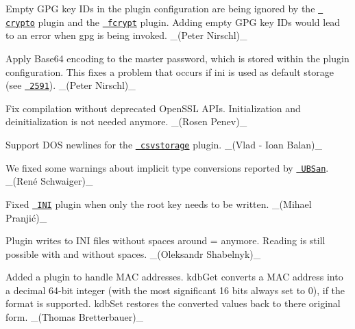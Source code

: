 \begin{DoxyItemize}
\item Empty G\+PG key I\+Ds in the plugin configuration are being ignored by the \href{https://www.libelektra.org/plugins/crypto}{\texttt{ crypto}} plugin and the \href{https://www.libelektra.org/plugins/fcrypt}{\texttt{ fcrypt}} plugin. Adding empty G\+PG key I\+Ds would lead to an error when {\ttfamily gpg} is being invoked. \+\_\+(\+Peter Nirschl)\+\_\+
\item Apply Base64 encoding to the master password, which is stored within the plugin configuration. This fixes a problem that occurs if ini is used as default storage (see \href{https://github.com/ElektraInitiative/libelektra/issues/2591}{\texttt{ 2591}}). \+\_\+(\+Peter Nirschl)\+\_\+
\item Fix compilation without deprecated Open\+S\+SL A\+P\+Is. Initialization and deinitialization is not needed anymore. \+\_\+(\+Rosen Penev)\+\_\+
\end{DoxyItemize}


\begin{DoxyItemize}
\item Support D\+OS newlines for the \href{https://www.libelektra.org/plugins/csvstorage}{\texttt{ csvstorage}} plugin. \+\_\+(Vlad -\/ Ioan Balan)\+\_\+
\end{DoxyItemize}


\begin{DoxyItemize}
\item We fixed some warnings about implicit type conversions reported by \href{https://clang.llvm.org/docs/UndefinedBehaviorSanitizer.html}{\texttt{ U\+B\+San}}. \+\_\+(René Schwaiger)\+\_\+
\end{DoxyItemize}


\begin{DoxyItemize}
\item Fixed \href{https://www.libelektra.org/plugins/ini}{\texttt{ I\+NI}} plugin when only the root key needs to be written. \+\_\+(Mihael Pranjić)\+\_\+
\item Plugin writes to I\+NI files without spaces around \textquotesingle{}=\textquotesingle{} anymore. Reading is still possible with and without spaces. \+\_\+(\+Oleksandr Shabelnyk)\+\_\+
\end{DoxyItemize}


\begin{DoxyItemize}
\item Added a plugin to handle M\+AC addresses. {\ttfamily kdb\+Get} converts a M\+AC address into a decimal 64-\/bit integer (with the most significant 16 bits always set to 0), if the format is supported. {\ttfamily kdb\+Set} restores the converted values back to there original form. \+\_\+(\+Thomas Bretterbauer)\+\_\+
\end{DoxyItemize}


